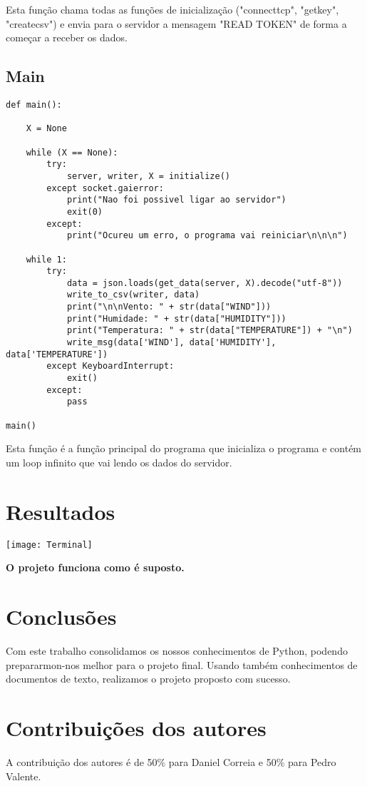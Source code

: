 \documentclass{report}
\begin{document}
Esta função chama todas as funções de inicialização ("connect\textunderscore tcp", "get\textunderscore key", "create\textunderscore csv") e envia para o servidor a mensagem "READ TOKEN"  de forma a começar a receber os dados.

\newpage

\section{Main}
\begin{lstlisting}
def main():
	
	X = None
		
	while (X == None):	
		try:
			server, writer, X = initialize()
		except socket.gaierror:
			print("Nao foi possivel ligar ao servidor")
			exit(0)
		except:
			print("Ocureu um erro, o programa vai reiniciar\n\n\n")
	
	while 1:
		try:
			data = json.loads(get_data(server, X).decode("utf-8"))
			write_to_csv(writer, data)
			print("\n\nVento: " + str(data["WIND"]))
			print("Humidade: " + str(data["HUMIDITY"]))
			print("Temperatura: " + str(data["TEMPERATURE"]) + "\n")
			write_msg(data['WIND'], data['HUMIDITY'], data['TEMPERATURE'])
		except KeyboardInterrupt:
			exit()
		except:
			pass
		
main()
\end{lstlisting}

Esta função é a função principal do programa que inicializa o programa e contém um loop infinito que vai lendo os dados do servidor.


\chapter{Resultados}
\label{chap.resultados}

\texttt{[image: Terminal]}
\newline
\newline

\textbf{O projeto funciona como é suposto.} 


\chapter{Conclusões}
\label{chap.conclusao}
Com este trabalho consolidamos os nossos conhecimentos de Python, podendo prepararmon-nos melhor para o projeto final. \newline Usando também conhecimentos de documentos de texto, realizamos o projeto proposto com sucesso. 

\chapter*{Contribuições dos autores}
A contribuição dos autores é de 50\% para Daniel Correia e 50\% para Pedro Valente.
\end{document}
